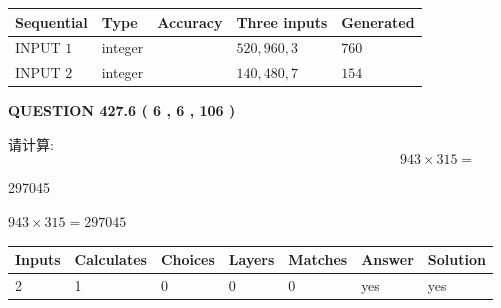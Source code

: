 \documentclass{ctexart}
\begin{document}
   
  
  
\noindent\begin{tabular}{|l|l|l|l|l|}
\hline
 Sequential & Type & Accuracy & Three inputs & Generated \\ 
\hline
 
 
  INPUT $  1 $ & integer &  & $
 520
 , 
 960
 , 
 3
 $ & $ 760 $ 
 \\  \hline  
 
 
  INPUT $  2 $ & integer &  & $
 140
 , 
 480
 , 
 7
 $ & $ 154 $ 
 \\  \hline  
 \end{tabular}
   
   
  
\vspace{0.2in}
  
{\textbf{\Large{QUESTION
427.6 
 ( 6 , 6 , 106 )
}}}
  
  
 
请计算:
\begin{equation}
943  \times    %
315 = \nonumber
\end{equation}
 
 
 
\noindent{}
 
 

297045
 
 
\noindent{}
 
 

 
 
 
\noindent{}
 
 

$ %
943 \times  %
315=   %
297045$
 
 
\noindent{}
 
 

 
   
   
   
   
\noindent\begin{tabular}{|l|l|l|l|l|l|l|}
 \hline
Inputs & Calculates & Choices & Layers & Matches & Answer & Solution \\ \hline
 2  & 
 1  & 
 0
  & 
 0  & 
 0  & 
  yes & 
  yes 
  \\ \hline
 \end{tabular}
   
\end{document}
